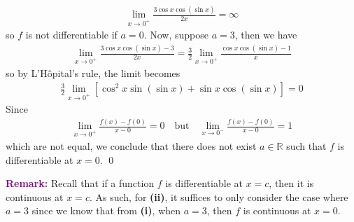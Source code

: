 \documentclass[12pt]{article}
\begin{document}
\begin{enumerate}[label=\textbf{(\roman*)}]
\begin{align*}
        \lim_{x\rightarrow 0^+}\frac{3\operatorname{cos}x\operatorname{cos}\left(\operatorname{sin}x\right)}{2x}=\infty
    \end{align*}
    so $f$ is not differentiable if $a=0$. Now, suppose $a=3$, then we have 
    \begin{align*}
        \lim_{x\rightarrow 0^+}\frac{3\operatorname{cos}x\operatorname{cos}\left(\operatorname{sin}x\right)-3}{2x}=\frac{3}{2}\lim_{x\rightarrow 0^+}\frac{\operatorname{cos}x\operatorname{cos}\left(\operatorname{sin}x\right)-1}{x}
    \end{align*}
    so by L'Hôpital's rule, the limit becomes \begin{align*}
        \frac{3}{2}\lim_{x\rightarrow 0^+}\left[\operatorname{cos}^2x\operatorname{sin}\left(\operatorname{sin}x\right)+\operatorname{sin}x\operatorname{cos}\left(\operatorname{sin}x\right)\right]=0
    \end{align*}
    Since \begin{align*}
        \lim_{x\rightarrow 0^+}\frac{f\left(x\right)-f\left(0\right)}{x-0}=0\quad\text{but}\quad\lim_{x\rightarrow 0^-}\frac{f\left(x\right)-f\left(0\right)}{x-0}=1
    \end{align*}
    which are not equal, we conclude that there does not exist $a\in\mathbb{R}$ such that $f$ is differentiable at $x=0$. \qed 
\end{enumerate}
\textbf{\textsf{\textcolor{purple}{Remark:}}} Recall that if a function $f$ is differentiable at $x=c$, then it is continuous at $x=c$. As such, for \textbf{(ii)}, it suffices to only consider the case where $a=3$ since we know that from \textbf{(i)}, when $a=3$, then $f$ is continuous at $x=0$.
\end{document}
